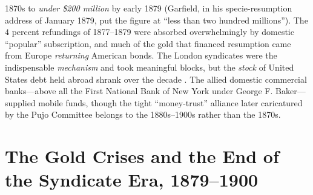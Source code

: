 \documentclass[12pt]{article}
\begin{document}
1870s to \emph{under \$200 million} by early 1879 (Garfield, in his
specie-resumption address of January 1879, put the figure at ``less than two
hundred millions''). The $4$ percent refundings of 1877--1879 were absorbed
overwhelmingly by domestic ``popular'' subscription, and much of the gold that
financed resumption came from Europe \emph{returning} American bonds. The London
syndicates were the indispensable \emph{mechanism} and took meaningful blocks,
but the \emph{stock} of United States debt held abroad shrank over the decade
\citep{morgan1885, dewey1903financial}. The allied domestic commercial
banks---above all the First National Bank of New York under George F. Baker---
supplied mobile funds, though the tight ``money-trust'' alliance later
caricatured by the Pujo Committee belongs to the 1880s--1900s rather than the
1870s.

\section{The Gold Crises and the End of the Syndicate Era, 1879--1900}
\end{document}
